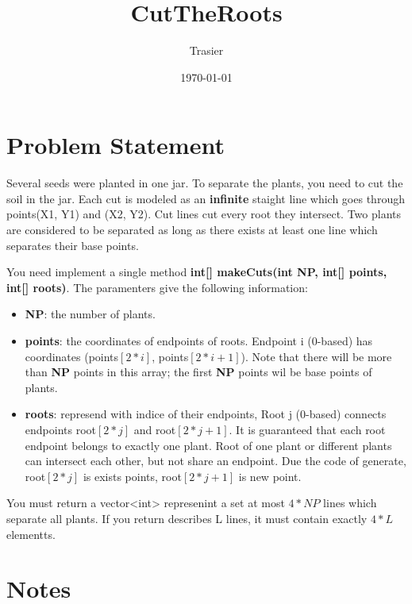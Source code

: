 \documentclass[UTF8]{ctexart}
\theoremstyle{definition}
\theoremstyle{remark}
\numberwithin{equation}{subsection}
\newcommand{\Emph}{\textbf}
\begin{document}
\title{\Huge CutTheRoots}
\vspace{2cm}
\author{\Large Trasier}
\date{\today}
\maketitle

\section{Problem Statement}
\label{sec:problem_statement}
	
	Several seeds were planted in one jar.
	To separate the plants, you need to cut the soil in the jar.
	Each cut is modeled as an \Emph{infinite} staight line which goes through points(X1, Y1) and (X2, Y2).
	Cut lines cut every root they intersect.
	Two plants are considered to be separated as long as there exists at least one line which separates their base points.
	
	You need implement a single method \Emph{int[] makeCuts(int NP, int[] points, int[] roots)}.
	The paramenters give the following information:
	\begin{itemize}
	
		\item \Emph{NP}: the number of plants.
		
		\item \Emph{points}: the coordinates of endpoints of roots.
			Endpoint i (0-based) has coordinates (points$[2*i]$, points$[2*i+1]$).
			Note that there will be more than \Emph{NP} points in this array;
			the first \Emph{NP} points wil be base points of plants.
			
		\item \Emph{roots}:	represend with indice of their endpoints,
			Root j (0-based) connects endpoints root$[2*j]$ and root$[2*j+1]$.
			It is guaranteed that each root endpoint belongs to exactly one plant.
			Root of one plant or different plants can intersect each other, but not share an endpoint.
			Due the code of generate, root$[2*j]$ is exists points, root$[2*j+1]$ is new point.
		
	\end{itemize}
	
	You must return a vector<int> represenint a set at most $4 * NP$ lines which separate all plants.
	If you return describes L lines, it must contain exactly $4 * L$ elementts.

\section{Notes}	
\label{sec:notes}
\end{document}
